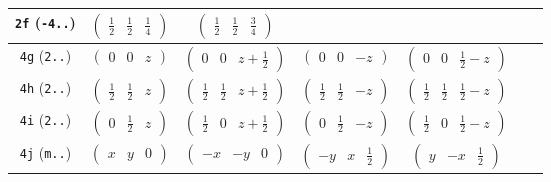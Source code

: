 \documentclass[fleqn,9pt,landscape]{jsarticle}
\begin{document}
\begin{center}
\begin{longtable}{ccccccc}
{\tt 2f} ({\tt -4..}) & $ \begin{pmatrix} \frac{1}{2} & \frac{1}{2} & \frac{1}{4} \end{pmatrix} $ & $ \begin{pmatrix} \frac{1}{2} & \frac{1}{2} & \frac{3}{4} \end{pmatrix} $ & $  $ & $  $ & $  $ & $  $ \\ \hline
{\tt 4g} ({\tt 2..}) & $ \begin{pmatrix} 0 & 0 & z \end{pmatrix} $ & $ \begin{pmatrix} 0 & 0 & z + \frac{1}{2} \end{pmatrix} $ & $ \begin{pmatrix} 0 & 0 & - z \end{pmatrix} $ & $ \begin{pmatrix} 0 & 0 & \frac{1}{2} - z \end{pmatrix} $ & $  $ & $  $ \\ \hline
{\tt 4h} ({\tt 2..}) & $ \begin{pmatrix} \frac{1}{2} & \frac{1}{2} & z \end{pmatrix} $ & $ \begin{pmatrix} \frac{1}{2} & \frac{1}{2} & z + \frac{1}{2} \end{pmatrix} $ & $ \begin{pmatrix} \frac{1}{2} & \frac{1}{2} & - z \end{pmatrix} $ & $ \begin{pmatrix} \frac{1}{2} & \frac{1}{2} & \frac{1}{2} - z \end{pmatrix} $ & $  $ & $  $ \\ \hline
{\tt 4i} ({\tt 2..}) & $ \begin{pmatrix} 0 & \frac{1}{2} & z \end{pmatrix} $ & $ \begin{pmatrix} \frac{1}{2} & 0 & z + \frac{1}{2} \end{pmatrix} $ & $ \begin{pmatrix} 0 & \frac{1}{2} & - z \end{pmatrix} $ & $ \begin{pmatrix} \frac{1}{2} & 0 & \frac{1}{2} - z \end{pmatrix} $ & $  $ & $  $ \\ \hline
{\tt 4j} ({\tt m..}) & $ \begin{pmatrix} x & y & 0 \end{pmatrix} $ & $ \begin{pmatrix} - x & - y & 0 \end{pmatrix} $ & $ \begin{pmatrix} - y & x & \frac{1}{2} \end{pmatrix} $ & $ \begin{pmatrix} y & - x & \frac{1}{2} \end{pmatrix} $ & $  $ & $  $ \\ \hline

\end{longtable}
\end{center}
\end{document}

